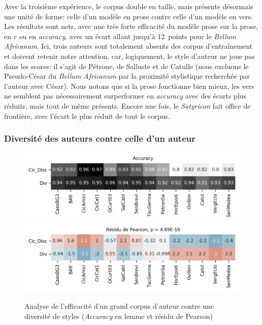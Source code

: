 Avec la troisième expérience, le corpus double en taille, mais présente désormais une unité de forme: celle d'un modèle en prose contre celle d'un modèle en vers. Les résultats sont nets, avec une très forte efficacité du modèle prose sur la prose, en $r$ ou en \textit{accuracy}, avec un écart allant jusqu'à 12~points pour le \textit{Bellum Africanum}. Ici, trois auteurs sont totalement absents  des corpus d'entraînement et doivent retenir notre attention, car, logiquement, le style d'auteur ne joue pas dans les scores: il s'agit de Pétrone, de Salluste et de Catulle (nous excluons le Pseudo-César du \textit{Bellum Africanum} par la proximité stylistique recherchée par l'auteur avec César). Nous notons que si la prose fonctionne bien mieux, les vers ne semblent pas nécessairement surperformer en \textit{accuracy} avec des écarts plus réduits, mais tout de même présents. Encore une fois, le \textit{Satyricon} fait office de frontière, avec l'écart le plus réduit de tout le corpus.

\subsubsection{Diversité des auteurs contre celle d'un auteur}

\begin{figure}[ht]
    \centering
    \includegraphics[width=0.7\linewidth]{results/lemmatisation/longreeVariante/LongreeVariante-AccuracyDiversiteDAuteursContreDiversiteDAuteur-Lemme.png}
    \includegraphics[width=0.7\linewidth]{results/lemmatisation/longreeVariante/LongreeVariante-AssocPlotDiversiteDAuteursContreDiversiteDAuteur-Lemme.png}
    \caption{Analyse de l'efficacité d'un grand corpus d'auteur contre une diversité de styles (\textit{Accuracy} en lemme et résidu de Pearson)}
    \label{fig:lemmatisation:longree:divAuteursVSTailleAuteur}
\end{figure}

